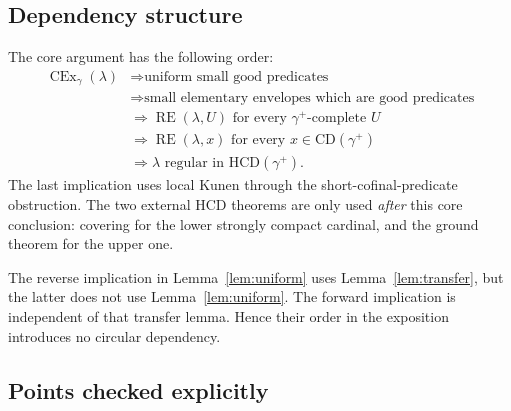 \documentclass[11pt,letterpaper]{article}
\theoremstyle{definition}
\newcommand{\CEx}{\operatorname{CEx}}
\newcommand{\CD}{\mathrm{CD}}
\newcommand{\HCD}{\mathrm{HCD}}
\newcommand{\RE}{\operatorname{RE}}
\begin{document}
\subsection{Dependency structure}

The core argument has the following order:
\begin{align*}
\CEx_\gamma(\lambda)
&\Longrightarrow \text{uniform small good predicates}\\
&\Longrightarrow \text{small elementary envelopes which are good predicates}\\
&\Longrightarrow \RE(\lambda,U)\text{ for every }\gamma^+\text{-complete }U\\
&\Longrightarrow \RE(\lambda,x)\text{ for every }x\in\CD(\gamma^+)\\
&\Longrightarrow \lambda\text{ regular in }\HCD(\gamma^+).
\end{align*}
The last implication uses local Kunen through the short-cofinal-predicate obstruction. The two external HCD theorems are only used \emph{after} this core conclusion: covering for the lower strongly compact cardinal, and the ground theorem for the upper one.

The reverse implication in Lemma~\ref{lem:uniform} uses Lemma~\ref{lem:transfer}, but the latter does not use Lemma~\ref{lem:uniform}. The forward implication is independent of that transfer lemma. Hence their order in the exposition introduces no circular dependency.

\subsection{Points checked explicitly}
\end{document}
